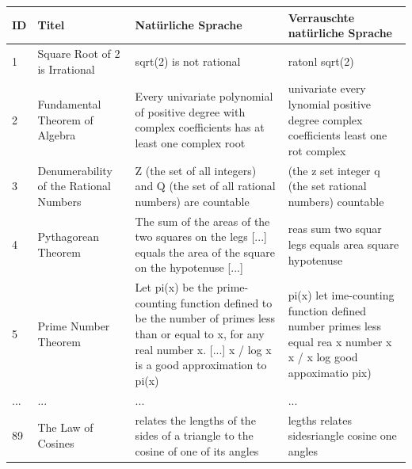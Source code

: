 \documentclass[12pt,letterpaper]{article} %
\begin{document}
\begin{table}[H]
\centering
\scriptsize
\begin{tabularx}{\textwidth}{l>{\RaggedRight\arraybackslash}X>{\RaggedRight\arraybackslash}X>{\RaggedRight\arraybackslash}X}
\toprule
\textbf{ID} & \textbf{Titel} & \textbf{Natürliche Sprache} & \textbf{Verrauschte natürliche Sprache} \\
\midrule

1 & Square Root of 2 is Irrational & sqrt(2) is not rational\footnotemark[1] & ratonl sqrt(2) \\

\midrule

2 & Fundamental Theorem of Algebra & Every univariate polynomial of positive degree with complex coefficients has at least one complex root\footnotemark[2] & univariate every lynomial positive degree complex coefficients least one rot complex \\

\midrule

3 & Denumerability of the Rational Numbers &

Z (the set of all integers) and Q (the set of all rational numbers) are countable\footnotemark[3] & (the z set integer q (the set rational numbers) countable \\

\midrule

4 & Pythagorean Theorem & The sum of the areas of the two squares on the legs [...] equals the area of the square on the hypotenuse [...]\footnotemark[4] & reas sum two squar legs equals area square hypotenuse \\

\midrule

5 & Prime Number Theorem & Let pi(x) be the prime-counting function defined to be the number of primes less than or equal to x, for any real number x. [...] x / log x is a good approximation to pi(x)\footnotemark[5] & pi(x) let ime-counting function defined number primes less equal rea x number x x / x log good appoximatio pix) \\

\midrule

... & ... & ... & ... \\

\midrule

89 & The Law of Cosines & relates the lengths of the sides of a triangle to the cosine of one of its angles\footnotemark[6] & legths relates sidesriangle cosine one angles \\


\end{tabularx}
\end{table}
\end{document}
